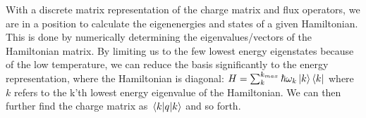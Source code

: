 With a discrete matrix representation of the charge matrix and flux operators, we are in a position to calculate the eigenenergies and states of a given Hamiltonian. This is done by numerically determining the eigenvalues/vectors of the Hamiltonian matrix. By limiting us to the few lowest energy eigenstates because of the low temperature, we can reduce the basis significantly to the energy representation, where the Hamiltonian is diagonal: $H = \sum_k^{k_{max}} \hbar \omega_k \ket{k}\bra{k}$ where $k$ refers to the k'th lowest energy eigenvalue of the Hamiltonian. We can then further find the charge matrix as $\mel{k}{q}{k}$ and so forth. 














